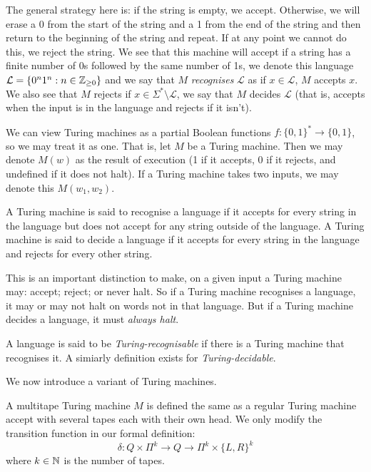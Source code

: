 \begin{example}
\begin{center}
\begin{tikzcd}
    \end{tikzcd}
  \end{center}
  The general strategy here is: if the string is empty, we accept. Otherwise, we will erase a 0 from the start of the string and a 1 from the end of the string and then return to the beginning of the string and repeat. If at any point we cannot do this, we reject the string. We see that this machine will accept if a string has a finite number of 0s followed by the same number of 1s, we denote this language $\mathcal L = \{0^n1^n: n \in \Z_{\geq 0}\}$ and we say that $M$ \emph{recognises} $\mathcal L$ as if $x \in \mathcal L$, $M$ accepts $x$. We also see that $M$ rejects if $x \in \Sigma^* \setminus \mathcal L$, we say that $M$ decides $\mathcal L$ (that is, accepts when the input is in the language and rejects if it isn't).
\end{example}

We can view Turing machines as a partial Boolean functions $f: \{0,1\}^* \to \{0,1\}$, so we may treat it as one. That is, let $M$ be a Turing machine. Then we may denote $M(w)$ as the result of execution (1 if it accepts, 0 if it rejects, and undefined if it does not halt). If a Turing machine takes two inputs, we may denote this $M(w_1, w_2)$. 

\begin{definition}
  A Turing machine is said to recognise a language if it accepts for every string in the language but does not accept for any string outside of the language. A Turing machine is said to decide a language if it accepts for every string in the language and rejects for every other string.
\end{definition}

This is an important distinction to make, on a given input a Turing machine may: accept; reject; or never halt. So if a Turing machine recognises a language, it may or may not halt on words not in that language. But if a Turing machine decides a language, it must \emph{always halt}.

\begin{definition}
  A language is said to be \emph{Turing-recognisable} if there is a Turing machine that recognises it. A simiarly definition exists for \emph{Turing-decidable}.
\end{definition}

We now introduce a variant of Turing machines.

\begin{definition}
  A multitape Turing machine $M$ is defined the same as a regular Turing machine accept with several tapes each with their own head. We only modify the transition function in our formal definition: \[\delta: Q \times \Pi^k \to Q \to \Pi^k \times \{L, R\}^k\] where $k \in \N$ is the number of tapes.
\end{definition}

